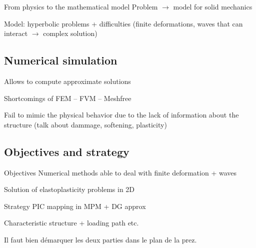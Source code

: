 

\begin{frame}{From physics to the mathematical model}
  Problem $\rightarrow$ model for solid mechanics

      
  Model: hyperbolic problems + difficulties (finite deformations, waves that can interact $\rightarrow$ complex solution)
\end{frame}
\subsection*{Numerical simulation}
\begin{frame}
  Allows to compute approximate solutions

  Shortcomings of FEM -- FVM -- Meshfree

  Fail to mimic the physical behavior due to the lack of information about the structure (talk about dammage, softening, plasticity)
\end{frame}

\subsection*{Objectives and strategy}
\begin{frame}{Objectives}
  Numerical methods able to deal with finite deformation + waves

  Solution of elastoplasticity problems in 2D
\end{frame}

\begin{frame}{Strategy}
  PIC mapping in MPM + DG approx

  Characteristic structure + loading path etc.

  Il faut bien démarquer les deux parties dans le plan de la prez.
\end{frame}


